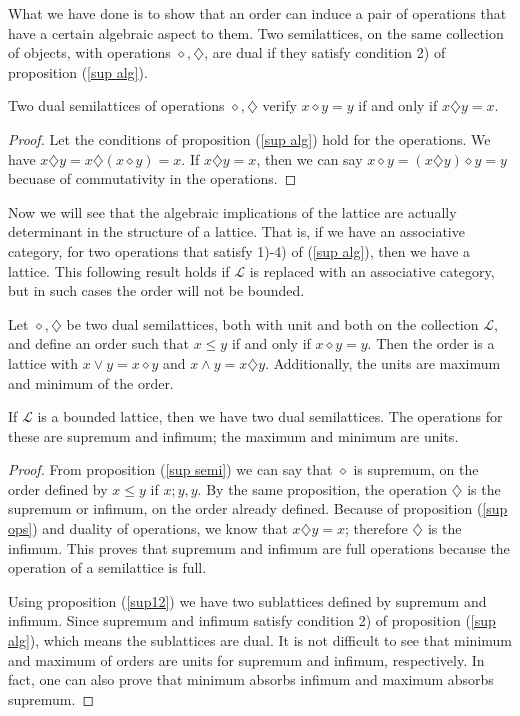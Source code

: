 \documentclass [12pt]{book}
\begin{document}
What we have done is to show that an order can induce a pair of operations that have a certain algebraic aspect to them. Two semilattices, on the same collection of objects, with operations $\diamond,\diamondsuit$, are dual if they satisfy condition 2) of proposition (\ref{sup alg}).

\begin{proposition}Two dual semilattices of operations $\diamond,\diamondsuit$ verify $x\diamond y=y$ if and only if $x\diamondsuit y=x$.\label{sup ops}\end{proposition}

\begin{proof}Let the conditions of proposition (\ref{sup alg}) hold for the operations. We have $x\diamondsuit y=x\diamondsuit(x\diamond y)=x$. If $x\diamondsuit y=x$, then we can say $x\diamond y=(x\diamondsuit y)\diamond y=y$ becuase of commutativity in the operations.\end{proof}

Now we will see that the algebraic implications of the lattice are actually determinant in the structure of a lattice. That is, if we have an associative category, for two operations that satisfy 1)-4) of (\ref{sup alg}), then we have a lattice. This following result holds if $\mathcal L$ is replaced with an associative category, but in such cases the order will not be bounded.

\begin{theorem}Let $\diamond,\diamondsuit$ be two dual semilattices, both with unit and  both on the collection $\mathcal L$, and define an order such that $x\leq y$ if and only if $x\diamond y=y$. Then the order is a lattice with $x\vee y=x\diamond y$ and $x\wedge y=x\diamondsuit y$. Additionally, the units are maximum and minimum of the order.

If $\mathcal L$ is a bounded lattice, then we have two dual semilattices. The operations for these are supremum and infimum; the maximum and minimum are units.\end{theorem}

\begin{proof}From proposition (\ref{sup semi}) we can say that $\diamond$ is supremum, on the order defined by $x\leq y$ if $x;y,y$. By the same proposition, the operation $\diamondsuit$ is the supremum or infimum, on the order already defined.
Because of proposition (\ref{sup ops}) and duality of operations, we know that $x\diamondsuit y=x$; therefore $\diamondsuit$ is the infimum. This proves that supremum and infimum are full operations because the operation of a semilattice is full.

Using proposition (\ref{sup12}) we have two sublattices defined by supremum and infimum. Since supremum and infimum satisfy condition 2) of proposition (\ref{sup alg}), which means the sublattices are dual. It is not difficult to see that minimum and maximum of orders are units for supremum and infimum, respectively. In fact, one can also prove that minimum absorbs infimum and maximum absorbs supremum.\end{proof}
\end{document}
